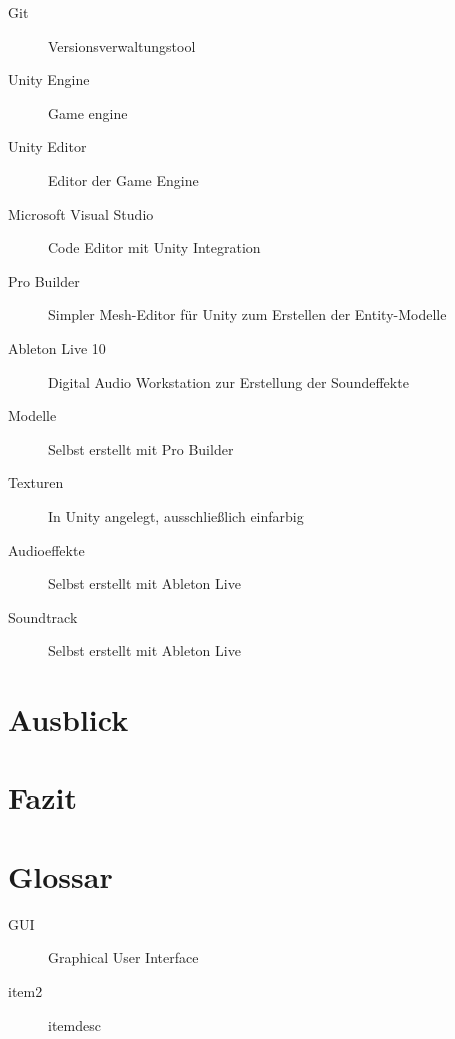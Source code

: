 \documentclass[a4paper,10pt,ngerman,fontsize=12pt]{scrreprt}
\begin{document}
\begin{description}
\item[Git] Versionsverwaltungstool
\item[Unity Engine] Game engine
\item[Unity Editor] Editor der Game Engine
\item[Microsoft Visual Studio] Code Editor mit Unity Integration
\item[Pro Builder] Simpler Mesh-Editor für Unity zum Erstellen der Entity-Modelle
\item[Ableton Live 10] Digital Audio Workstation zur Erstellung der Soundeffekte
\vspace{5mm}
\item[Modelle] Selbst erstellt mit Pro Builder
\item[Texturen] In Unity angelegt, ausschlie{\ss}lich einfarbig
\item[Audioeffekte] Selbst erstellt mit Ableton Live
\item[Soundtrack] Selbst erstellt mit Ableton Live

\end{description}






\chapter{Ausblick}

\lipsum[3]





\chapter{Fazit}

\lipsum[3]





\chapter{Glossar}

\begin{description}
\item[GUI] Graphical User Interface
\item[item2] itemdesc
\end{description}
\end{document}
